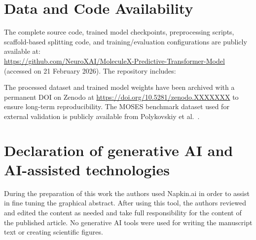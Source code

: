 \documentclass[preprint,12pt]{elsarticle}
\begin{document}
\clearpage
\section{Data and Code Availability}

The complete source code, trained model checkpoints, preprocessing scripts, scaffold-based splitting code, and training/evaluation configurations are publicly available at:\\ \url{https://github.com/NeuroXAI/MoleculeX-Predictive-Transformer-Model}\\ (accessed on 21 February 2026). The repository includes:


The processed dataset and trained model weights have been archived with a permanent DOI on Zenodo at \url{https://doi.org/10.5281/zenodo.XXXXXXX} to ensure long-term reproducibility. The MOSES benchmark dataset used for external validation is publicly available from Polykovskiy et al.\ \cite{polykovskiy2020molecular}.

\section{Declaration of generative AI and AI-assisted technologies}
During the preparation of this work the authors used Napkin.ai in order to assist in fine tuning the graphical abstract. After using this tool, the authors reviewed and edited the content as needed and take full responsibility for the content of the published article. No generative AI tools were used for writing the manuscript text or creating scientific figures.


\appendix


  
 






\end{document}
